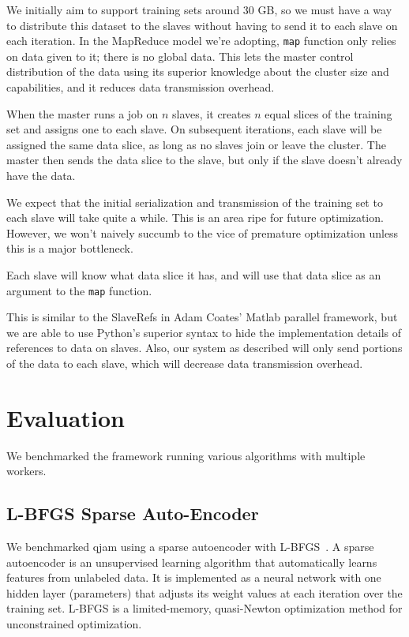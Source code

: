 \documentclass[%
  final,
  notitlepage,
  narroweqnarray,
  inline,
]{ieee}
\begin{document}
We initially aim to support training sets around 30 GB, so we must have a way
to distribute this dataset to the slaves without having to send it to each
slave on each iteration. In the MapReduce model we're adopting, {\tt map}
function only relies on data given to it; there is no global data. This lets
the master control distribution of the data using its superior knowledge about
the cluster size and capabilities, and it reduces data transmission overhead.

When the master runs a job on $n$ slaves, it creates $n$ equal slices of the
training set and assigns one to each slave. On subsequent iterations, each
slave will be assigned the same data slice, as long as no slaves join or leave
the cluster. The master then sends the data slice to the slave, but only if the
slave doesn't already have the data.

We expect that the initial serialization and transmission of the training set
to each slave will take quite a while. This is an area ripe for future
optimization. However, we won't naively succumb to the vice of premature
optimization unless this is a major bottleneck.

Each slave will know what data slice it has, and will use that data slice as an
argument to the {\tt map} function.

This is similar to the SlaveRefs in Adam Coates' Matlab parallel framework, but
we are able to use Python's superior syntax to hide the implementation details
of references to data on slaves. Also, our system as described will only send
portions of the data to each slave, which will decrease data transmission
overhead.

\section{Evaluation}

We benchmarked the framework running various algorithms with multiple workers.

\subsection{L-BFGS Sparse Auto-Encoder}

We benchmarked qjam using a sparse autoencoder with L-BFGS~\cite{lbfgs}. A
sparse autoencoder is an unsupervised learning algorithm that automatically
learns features from unlabeled data. It is implemented as a neural network with
one hidden layer (parameters) that adjusts its weight values at each iteration
over the training set. L-BFGS is a limited-memory, quasi-Newton optimization
method for unconstrained optimization.
\end{document}
